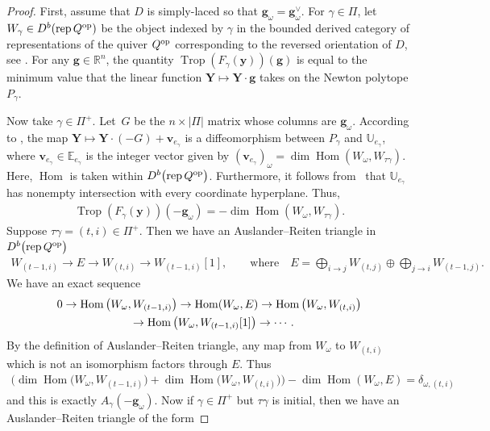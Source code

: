 \documentclass[10pt,a4paper]{amsart}
\def\R{{\mathbb R}}
\def\Hom{\operatorname{Hom}}
\def\E{{\mathbb E}}
\def\U{{\mathbb U}}
\def\y{{\mathbf y}}
\def\v{{\mathbf v}}
\def\Trop{\operatorname{Trop}}
\def\g{{\mathbf g}}
\def\Y{{\mathbf Y}}
\numberwithin{equation}{section}
\begin{document}
\begin{proof}
First, assume that $D$ is simply-laced so that $\g_\omega = \g^\vee_\omega$. For $\gamma \in \Pi$, let $W_\gamma \in D^b( {\rm rep}\,Q^{\rm op})$ be the object indexed by $\gamma$ in the bounded derived category of representations of the quiver $Q^{\rm op}$ corresponding to the reversed orientation of $D$, see \cite[Section~3]{BDMTY}. For any $\g \in \R^n$, the quantity $\Trop(F_\gamma(\y))(\g)$ is equal to the minimum value that the linear function $\Y \mapsto \Y \cdot \g$ takes on the Newton polytope $P_\gamma$.

Now take $\gamma \in \Pi^+$. Let~$G$ be the $n \times |\Pi|$ matrix whose columns are $\g_\omega$. According to \cite[Proof of Theorem~1]{BDMTY}, the map $\Y \mapsto \Y \cdot (-G) + \v_{e_{\gamma}}$ is a diffeomorphism between $P_\gamma$ and $\U_{e_\gamma}$, where $\v_{e_{\gamma}} \in \E_{e_\gamma}$ is the integer vector given by $(\v_{e_\gamma})_{\omega} = \dim \Hom(W_\omega, W_{\tau \gamma})$. Here, $\Hom$ is taken within $D^b\big( {\rm rep}\,Q^{\rm op}\big)$. Furthermore, it follows from~\cite{BDMTY} that $\U_{e_\gamma}$ has nonempty intersection with every coordinate hyperplane. Thus,
\begin{gather*}
\Trop(F_\gamma(\y))(-\g_\omega) = -\dim \Hom(W_\omega, W_{\tau \gamma}).
\end{gather*}
Suppose $\tau \gamma = (t,i) \in \Pi^+$. Then we have an Auslander--Reiten triangle in $D^b\big( {\rm rep}\, Q^{\rm op}\big)$
\begin{gather*}
W_{(t-1,i)} \to E \to W_{(t,i)} \to W_{(t-1,i)} [1],
 \qquad \text{where} \quad
E = \bigoplus_{i \to j} W_{(t,j)} \oplus \bigoplus_{j \to i} W_{(t-1,j)}.
\end{gather*}
We have an exact sequence
\begin{gather*}
0 \to \Hom\big(W_\omega, W_{(t-1,i)}\big) \to \Hom(W_\omega, E) \to \Hom\big(W_\omega, W_{(t,i)}\big)
\\ \hphantom{0}
{}\to \Hom\big(W_\omega, W_{(t-1,i)} [1]\big) \to \cdots.
\end{gather*}
By the definition of Auslander--Reiten triangle, any map from $W_\omega$ to $W_{(t,i)}$ which is not an isomorphism factors through $E$. Thus
\begin{gather*}
\big(\dim \Hom\big(W_\omega, W_{(t-1,i)}\big) + \dim\Hom\big(W_\omega, W_{(t,i)}\big)\big) - \dim \Hom(W_\omega, E) =\delta_{\omega,(t,i)}
\end{gather*}
and this is exactly $A_\gamma(-\g_\omega)$. Now if $\gamma \in \Pi^+$ but $\tau \gamma$ is initial, then we have an Auslander--Reiten triangle of the form

\end{proof}
\end{document}
